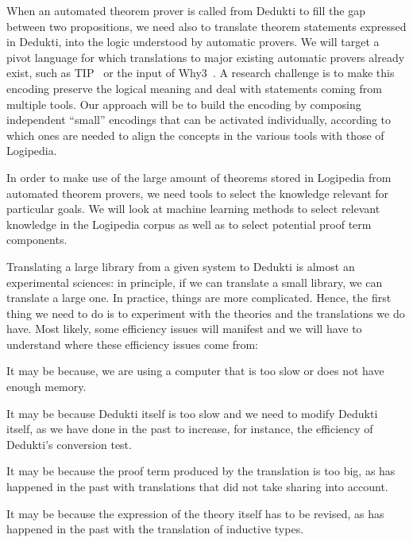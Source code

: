 When an automated theorem prover is called from Dedukti to fill the
gap between two propositions, we need also to translate theorem
statements expressed in Dedukti, into the logic understood by
automatic provers. We will target a pivot language for which
translations to major existing automatic provers already exist, such
as TIP~\cite{DBLP:conf/mkm/ClaessenJRS15} or the input of
Why3~\cite{DBLP:conf/esop/FilliatreP13}. A research challenge is to
make this encoding preserve the logical meaning and deal with
statements coming from multiple tools. Our approach will be to build
the encoding by composing independent ``small'' encodings that can be
activated individually, according to which ones are needed to align
the concepts in the various tools with those of Logipedia.

In order to make use of the large amount of theorems stored in
Logipedia from automated theorem provers, we need tools to select the
knowledge relevant for particular goals. We will look at machine
learning methods to select relevant knowledge in the Logipedia corpus
as well as to select potential proof term components.


Translating a large library from a given system to Dedukti is almost
an experimental sciences: in principle, if we can translate a small
library, we can translate a large one. In practice, things are more
complicated.  Hence, the first thing we need to do is to experiment
with the theories and the translations we do have. Most likely, some
efficiency issues will manifest and we will have to understand where
these efficiency issues come from:

\begin{compactitem}
\item It may be because, we are using a computer that is too slow or
  does not have enough memory.
\item It may be because Dedukti itself is too slow and we need to modify
  Dedukti itself, as we have done in the past to increase, for instance,
  the efficiency of Dedukti's conversion test.
\item It may be because the proof term produced by the translation is
  too big, as has happened in the past with translations that did not
  take sharing into account.
\item It may be because the expression of the theory itself has to be
  revised, as has happened in the past with the translation of
  inductive types.
\end{compactitem}

